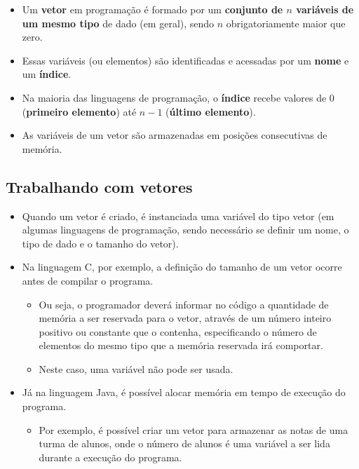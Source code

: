 \documentclass[12pt,a4paper]{article}
\providecommand{\tightlist}{%
      \setlength{\itemsep}{0pt}\setlength{\parskip}{0pt}}
\begin{document}
    \begin{itemize}
\tightlist
\item
  Um \textbf{vetor} em programação é formado por um \textbf{conjunto de
  \(n\) variáveis de um mesmo tipo} de dado (em geral), sendo \(n\)
  obrigatoriamente maior que zero.
\item
  Essas variáveis (ou elementos) são identificadas e acessadas por um
  \textbf{nome} e um \textbf{índice}.
\item
  Na maioria das linguagens de programação, o \textbf{índice} recebe
  valores de \(0\) (\textbf{primeiro elemento}) até \(n-1\)
  (\textbf{último elemento}).\\
\item
  As variáveis de um vetor são armazenadas em posições consecutivas de
  memória.
\end{itemize}

    \hypertarget{trabalhando-com-vetores}{%
\subsection{Trabalhando com vetores}\label{trabalhando-com-vetores}}

    \begin{itemize}
\tightlist
\item
  Quando um vetor é criado, é instanciada uma variável do tipo vetor (em
  algumas linguagens de programação, sendo necessário se definir um
  nome, o tipo de dado e o tamanho do vetor).
\item
  Na linguagem C, por exemplo, a definição do tamanho de um vetor ocorre
  antes de compilar o programa.

  \begin{itemize}
  \tightlist
  \item
    Ou seja, o programador deverá informar no código a quantidade de
    memória a ser reservada para o vetor, através de um número inteiro
    positivo ou constante que o contenha, especificando o número de
    elementos do mesmo tipo que a memória reservada irá comportar.
  \item
    Neste caso, uma variável não pode ser usada.
  \end{itemize}
\item
  Já na linguagem Java, é possível alocar memória em tempo de execução
  do programa.

  \begin{itemize}
  \tightlist
  \item
    Por exemplo, é possível criar um vetor para armazenar as notas de
    uma turma de alunos, onde o número de alunos é uma variável a ser
    lida durante a execução do programa.
  \end{itemize}
\end{itemize}
\end{document}
